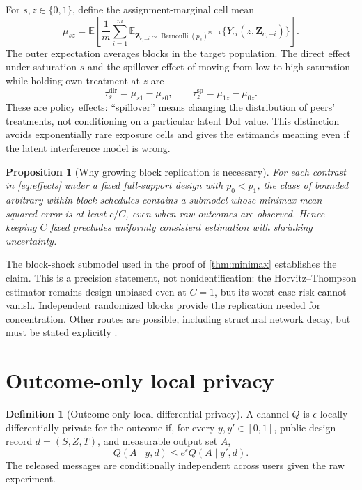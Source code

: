 \documentclass[11pt]{article}
\newtheorem{proposition}[theorem]{Proposition}
\theoremstyle{definition}
\newtheorem{definition}[theorem]{Definition}
\theoremstyle{remark}
\newcommand{\E}{\mathbb{E}}
\DeclareMathOperator{\Bern}{Bernoulli}
\begin{document}
For $s,z\in\{0,1\}$, define the assignment-marginal cell mean
\begin{equation}
  \mu_{sz}
  = \E\!\left[
      \frac{1}{m}\sum_{i=1}^m
      \E_{\mathbf Z_{c,-i}\sim\Bern(p_s)^{m-1}}
      \{Y_{ci}(z,\mathbf Z_{c,-i})\}
    \right].
  \label{eq:cellmean}
\end{equation}
The outer expectation averages blocks in the target population. The direct effect under
saturation $s$ and the spillover effect of moving from low to high saturation while holding
own treatment at $z$ are
\begin{equation}
  \tau^{\mathrm{dir}}_s=\mu_{s1}-\mu_{s0},
  \qquad
  \tau^{\mathrm{sp}}_z=\mu_{1z}-\mu_{0z}.
  \label{eq:effects}
\end{equation}
These are policy effects: ``spillover'' means changing the distribution of peers' treatments,
not conditioning on a particular latent DoI value. This distinction avoids exponentially rare
exposure cells and gives the estimands meaning even if the latent interference model is wrong.

\begin{proposition}[Why growing block replication is necessary]
\label{prop:replication}
For each contrast in \eqref{eq:effects} under a fixed full-support design with $p_0<p_1$, the
class of bounded arbitrary within-block schedules contains a submodel whose minimax mean
squared error is at least $c/C$, even when raw outcomes are observed. Hence keeping $C$ fixed
precludes uniformly consistent estimation with shrinking uncertainty.
\end{proposition}

The block-shock submodel used in the proof of \cref{thm:minimax} establishes the claim. This is
a precision statement, not nonidentification: the Horvitz--Thompson estimator remains
design-unbiased even at $C=1$, but its worst-case risk cannot vanish. Independent randomized
blocks provide the replication needed for concentration. Other routes are possible, including
structural network decay, but must be stated explicitly
\citep{BasseAiroldi2018,Leung2022}.

\section{Outcome-only local privacy}
\label{sec:privacy}

\begin{definition}[Outcome-only local differential privacy]
A channel $Q$ is $\epsilon$-locally differentially private for the outcome if, for every
$y,y'\in[0,1]$, public design record $d=(S,Z,T)$, and measurable output set $A$,
\[
  Q(A\mid y,d)\le e^{\epsilon}Q(A\mid y',d).
\]
The released messages are conditionally independent across users given the raw experiment.
\end{definition}
\end{document}
